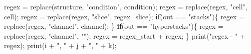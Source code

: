 \documentclass[
  12pt,
  a4paper,
]{book}
\newenvironment{Shaded}{}{}
\newcommand{\ControlFlowTok}[1]{\textcolor[rgb]{0.00,0.44,0.13}{\textbf{#1}}}
\newcommand{\NormalTok}[1]{#1}
\newcommand{\OperatorTok}[1]{\textcolor[rgb]{0.40,0.40,0.40}{#1}}
\newcommand{\StringTok}[1]{\textcolor[rgb]{0.25,0.44,0.63}{#1}}
\begin{document}
\begin{Shaded}
\begin{Highlighting}[]
\NormalTok{            regex }\OperatorTok{=}\NormalTok{ replace}\OperatorTok{(}\NormalTok{structure}\OperatorTok{,} \StringTok{"condition"}\OperatorTok{,}\NormalTok{ condition}\OperatorTok{);}
\NormalTok{            regex }\OperatorTok{=}\NormalTok{ replace}\OperatorTok{(}\NormalTok{regex}\OperatorTok{,} \StringTok{"cell"}\OperatorTok{,}\NormalTok{ cell}\OperatorTok{);}
\NormalTok{            regex }\OperatorTok{=}\NormalTok{ replace}\OperatorTok{(}\NormalTok{regex}\OperatorTok{,} \StringTok{"slice"}\OperatorTok{,}\NormalTok{ regex\_slice}\OperatorTok{);}
            \ControlFlowTok{if}\OperatorTok{(}\NormalTok{out }\OperatorTok{==} \StringTok{"stacks"}\OperatorTok{)\{}
\NormalTok{                regex }\OperatorTok{=}\NormalTok{ replace}\OperatorTok{(}\NormalTok{regex}\OperatorTok{,} \StringTok{"channel"}\OperatorTok{,}\NormalTok{ channel}\OperatorTok{);}
            \OperatorTok{\}}
            \ControlFlowTok{if}\OperatorTok{(}\NormalTok{out }\OperatorTok{==} \StringTok{"hyperstacks"}\OperatorTok{)\{}
\NormalTok{                regex }\OperatorTok{=}\NormalTok{ replace}\OperatorTok{(}\NormalTok{regex}\OperatorTok{,} \StringTok{"channel"}\OperatorTok{,} \StringTok{""}\OperatorTok{);}
\NormalTok{                regex }\OperatorTok{=}\NormalTok{ regex\_start }\OperatorTok{+}\NormalTok{ regex}\OperatorTok{;}
            \OperatorTok{\}}           
\NormalTok{            print}\OperatorTok{(}\StringTok{"regex {-} "} \OperatorTok{+}\NormalTok{ regex}\OperatorTok{);}
\NormalTok{            print}\OperatorTok{(}\NormalTok{i }\OperatorTok{+} \StringTok{", "} \OperatorTok{+}\NormalTok{ j }\OperatorTok{+} \StringTok{", "} \OperatorTok{+}\NormalTok{ k}\OperatorTok{);}
            

\end{Highlighting}
\end{Shaded}
\end{document}
